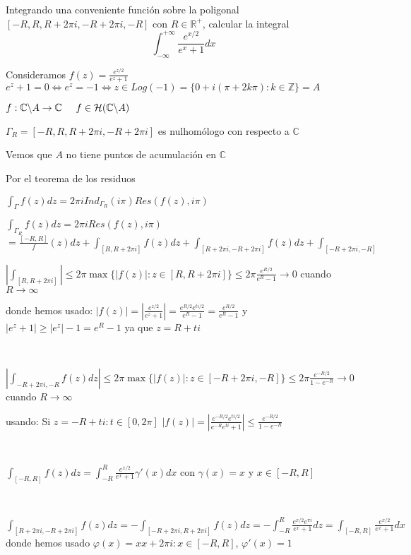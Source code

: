 \begin{ejer}
	Integrando una conveniente función sobre la poligonal $[-R,R,R+2\pi i,-R+2\pi i,-R]$ con $R\in\mathbb{R}^+$, calcular la integral
	$$ \int_{-\infty}^{+\infty} \frac{e^{x/2}}{e^x+1}dx $$
\end{ejer}
\begin{sol}

Consideramos 
$f(z) = \frac{e^{z/2}}{e^z+1}$
$e^z+1=0 \Longleftrightarrow e^z = -1 \Longleftrightarrow z\in Log(-1) = \{ 0+i(\pi+2k\pi) : k\in\mathbb{Z} \} = A$

$f : \mathbb{C}\backslash A \rightarrow \mathbb{C}\hspace{0.5cm} f\in\mathcal{H}(\mathbb{C}\backslash A)$

$\Gamma_R  = [-R,R,R+2\pi i, -R+2\pi i]$ es nulhomólogo con respecto a $\mathbb{C}$

Vemos que $A$ no tiene puntos de acumulación en $\mathbb{C}$

Por el teorema de los residuos

$\int_{\Gamma} f(z)dz = 2\pi i Ind_{\Gamma_R}(i\pi) Res(f(z),i\pi)$

$\int_{\Gamma_R} f(z)dz = 2\pi i Res(f(z),i\pi)$
$= \frac{[-R,R]} f(z)dz + \int_{[R,R+2\pi i]} f(z)dz + \int_{[R+2\pi i, -R+2\pi i]} f(z)dz + \int_{[-R+2\pi i, -R]}$


$\left| \int_{[R,R+2\pi i]} \right| \leq 2\pi\max\{ |f(z)| : z\in [R,R+2\pi i] \} \leq 2\pi \frac{e^{R/2}}{e^R-1} \rightarrow 0$ cuando $R\rightarrow \infty$

donde hemos usado:
$|f(z)| = |\frac{e^{z/2}}{e^z+1}| = \frac{e^{R/2} e^{ti/2}}{e^R-1} = \frac{e^{R/2}}{e^R-1}$
y
$|e^z+1| \geq |e^z|-1 = e^R-1$ ya que $z=R+ti$


\

$\left| \int_{-R+2\pi i, -R} f(z)dz \right| \leq 2\pi \max \{ |f(z)| : z\in[-R+2\pi i, -R] \} \leq 2\pi \frac{e^{-R/2}}{1-e^{-R}} \rightarrow 0$ cuando $R\rightarrow\infty$

usando:
Si $z= -R+ti : t\in[0,2\pi]$
$|f(z)| = \left| \frac{e^{-R/2}e^{ti/2}}{e^{-R}e^{ti}+1} \right| \leq \frac{e^{-R/2}}{1-e^{-R}}$

\

$\int_{[-R,R]} f(z)dz = \int_{-R}^{R} \frac{e^{x/2}}{e^x+1} \gamma'(x)dx$ con $\gamma(x)=x$ y $x\in[-R,R]$

\

$\int_{[R+2\pi i, -R+2\pi i]} f(z)dz = -\int_{[-R+2\pi i, R+2\pi i]} f(z)dz = -\int_{-R}^{R} \frac{e^{x/2}e^{\pi i}}{e^x+1}dz = \int_{[-R,R]} \frac{e^{x/2}}{e^x+1}dx$
donde hemos usado
$\varphi (x) = xx+2\pi i : x\in[-R,R]$, $\varphi'(x) = 1$


\end{sol}
